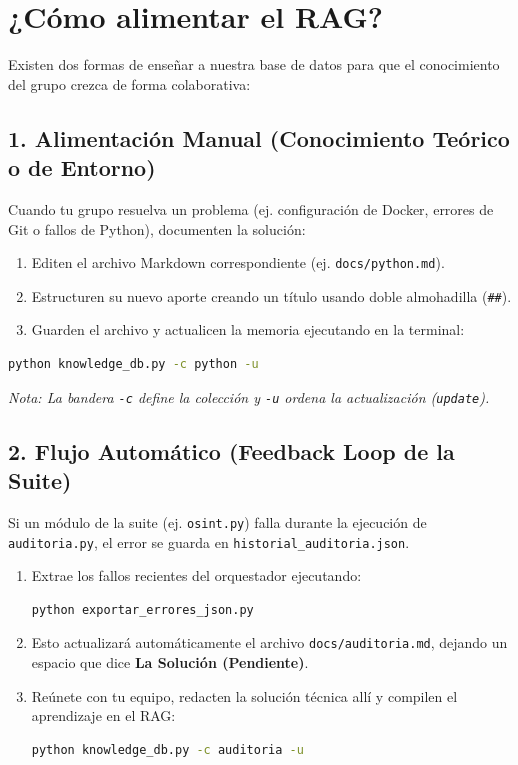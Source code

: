 \documentclass[12pt,a4paper]{article}
\begin{document}
\section{¿Cómo alimentar el RAG?}

Existen dos formas de enseñar a nuestra base de datos para que el conocimiento del grupo crezca de forma colaborativa:

\subsection{1. Alimentación Manual (Conocimiento Teórico o de Entorno)}
Cuando tu grupo resuelva un problema (ej. configuración de Docker, errores de Git o fallos de Python), documenten la solución:

\begin{enumerate}
    \item Editen el archivo Markdown correspondiente (ej. \texttt{docs/python.md}).
    \item Estructuren su nuevo aporte creando un título usando doble almohadilla (\texttt{\#\#}).
    \item Guarden el archivo y actualicen la memoria ejecutando en la terminal:
\end{enumerate}

\begin{lstlisting}[language=bash, caption={Actualizar colección de Python}]
python knowledge_db.py -c python -u
\end{lstlisting}
\textit{Nota: La bandera \texttt{-c} define la colección y \texttt{-u} ordena la actualización (\texttt{update}).}

\subsection{2. Flujo Automático (Feedback Loop de la Suite)}
Si un módulo de la suite (ej. \texttt{osint.py}) falla durante la ejecución de \texttt{auditoria.py}, el error se guarda en \texttt{historial\_auditoria.json}.

\begin{enumerate}
    \item Extrae los fallos recientes del orquestador ejecutando:
    \begin{lstlisting}[language=bash]
python exportar_errores_json.py
    \end{lstlisting}
    \item Esto actualizará automáticamente el archivo \texttt{docs/auditoria.md}, dejando un espacio que dice \textbf{La Solución (Pendiente)}.
    \item Reúnete con tu equipo, redacten la solución técnica allí y compilen el aprendizaje en el RAG:
    \begin{lstlisting}[language=bash]
python knowledge_db.py -c auditoria -u
    \end{lstlisting}
\end{enumerate}
\end{document}
